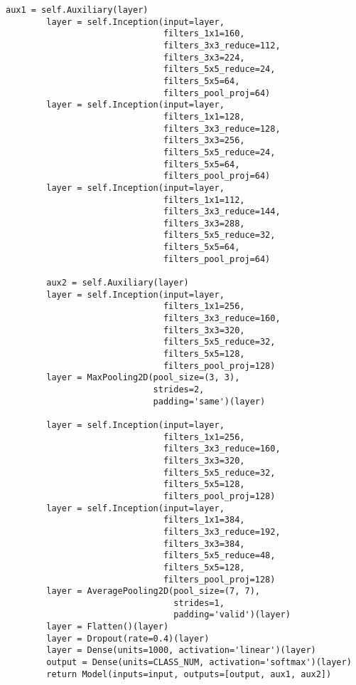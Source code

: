\begin{lstlisting}[caption=Модель googlenet. Продолжение, label = lst:googlenet_cont, style=realcode, firstnumber=52]
        aux1 = self.Auxiliary(layer)
        layer = self.Inception(input=layer,
                               filters_1x1=160,
                               filters_3x3_reduce=112,
                               filters_3x3=224,
                               filters_5x5_reduce=24,
                               filters_5x5=64,
                               filters_pool_proj=64)
        layer = self.Inception(input=layer,
                               filters_1x1=128,
                               filters_3x3_reduce=128,
                               filters_3x3=256,
                               filters_5x5_reduce=24,
                               filters_5x5=64,
                               filters_pool_proj=64)
        layer = self.Inception(input=layer,
                               filters_1x1=112,
                               filters_3x3_reduce=144,
                               filters_3x3=288,
                               filters_5x5_reduce=32,
                               filters_5x5=64,
                               filters_pool_proj=64)

        aux2 = self.Auxiliary(layer)
        layer = self.Inception(input=layer,
                               filters_1x1=256,
                               filters_3x3_reduce=160,
                               filters_3x3=320,
                               filters_5x5_reduce=32,
                               filters_5x5=128,
                               filters_pool_proj=128)
        layer = MaxPooling2D(pool_size=(3, 3),
                             strides=2,
                             padding='same')(layer)

        layer = self.Inception(input=layer,
                               filters_1x1=256,
                               filters_3x3_reduce=160,
                               filters_3x3=320,
                               filters_5x5_reduce=32,
                               filters_5x5=128,
                               filters_pool_proj=128)
        layer = self.Inception(input=layer,
                               filters_1x1=384,
                               filters_3x3_reduce=192,
                               filters_3x3=384,
                               filters_5x5_reduce=48,
                               filters_5x5=128,
                               filters_pool_proj=128)
        layer = AveragePooling2D(pool_size=(7, 7),
                                 strides=1,
                                 padding='valid')(layer)
        layer = Flatten()(layer)
        layer = Dropout(rate=0.4)(layer)
        layer = Dense(units=1000, activation='linear')(layer)
        output = Dense(units=CLASS_NUM, activation='softmax')(layer)
        return Model(inputs=input, outputs=[output, aux1, aux2])
\end{lstlisting}


